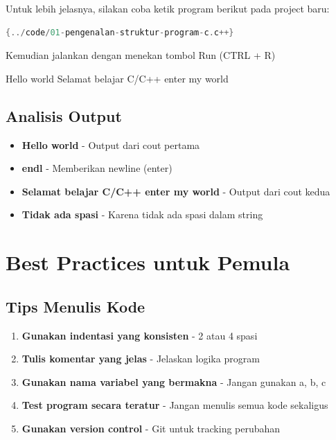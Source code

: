 Untuk lebih jelasnya, silakan coba ketik program berikut pada project baru:

\begin{lstlisting}[language=c++, caption=Struktur program C++]{../code/01-pengenalan-struktur-program-c.c++}
\end{lstlisting}

Kemudian jalankan dengan menekan tombol Run (CTRL + R)

\begin{lcverbatim}
Hello world
Selamat belajar C/C++ enter my world
\end{lcverbatim}

\subsection{Analisis Output}

\begin{itemize}
\item \textbf{Hello world} - Output dari cout pertama
\item \textbf{endl} - Memberikan newline (enter)
\item \textbf{Selamat belajar C/C++ enter my world} - Output dari cout kedua
\item \textbf{Tidak ada spasi} - Karena tidak ada spasi dalam string
\end{itemize}

\section{Best Practices untuk Pemula}

\subsection{Tips Menulis Kode}

\begin{enumerate}
\item \textbf{Gunakan indentasi yang konsisten} - 2 atau 4 spasi
\item \textbf{Tulis komentar yang jelas} - Jelaskan logika program
\item \textbf{Gunakan nama variabel yang bermakna} - Jangan gunakan a, b, c
\item \textbf{Test program secara teratur} - Jangan menulis semua kode sekaligus
\item \textbf{Gunakan version control} - Git untuk tracking perubahan
\end{enumerate}

